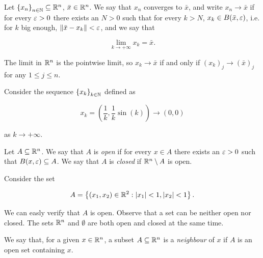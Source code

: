 \begin{definition}

    Let $\left\{ x_n \right\}_{n \in \mathbb{N}} \subseteq {\mathbb{R}^n}$, $\bar{x} \in {\mathbb{R}^n}$. We say that $x_n$ converges to $\bar{x}$, and write $x_n \to \bar{x}$ if for every $\varepsilon > 0$ there exists an $N > 0$ such that for every $k > N$, $x_k \in B(\bar{x},\varepsilon)$, i.e. for $k$ big enough, $\lVert \bar{x} - x_k \rVert < \varepsilon$, and we say that

    \[ \lim_{k \to +\infty} x_k = \bar{x}. \]

\end{definition}

\begin{remark}
    
    The limit in ${\mathbb{R}^n}$ is the pointwise limit, so $x_k \to \bar{x}$ if and only if $(x_k)_j \to (\bar{x})_j$ for any $1 \le j \le n$.

\end{remark}

\begin{example}
    
    Consider the sequence $\left\{ x_k \right\}_{k \in \mathbb{N}}$ defined as

    \[ x_k = \left( \frac1k, \frac1k \sin(k) \right) \to (0,0) \]

    as $k \to +\infty$.

\end{example}

\begin{definition}
    
    Let $A \subseteq {\mathbb{R}^n}$. We say that $A$ is \emph{open} if for every $x \in A$ there exists an $\varepsilon > 0$ such that $B(x,\varepsilon) \subseteq A$. We say that $A$ is \emph{closed} if ${\mathbb{R}^n} \setminus A$ is open.

\end{definition}

\begin{example}
    
    Consider the set 

    \[ A = \left\{ (x_1,x_2) \in \mathbb{R}^2 : \left|x_1\right| < 1, \left|x_2\right| < 1 \right\}. \]

    We can easly verify that $A$ is open. Observe that a set can be neither open nor closed. The sets ${\mathbb{R}^n}$ and $\emptyset$ are both open and closed at the same time.

\end{example}

\begin{definition}[Neighbour]
    
    We say that, for a given $x \in {\mathbb{R}^n}$, a subset $A \subseteq {\mathbb{R}^n}$ is a \emph{neighbour} of $x$ if $A$ is an open set containing $x$.

\end{definition}

